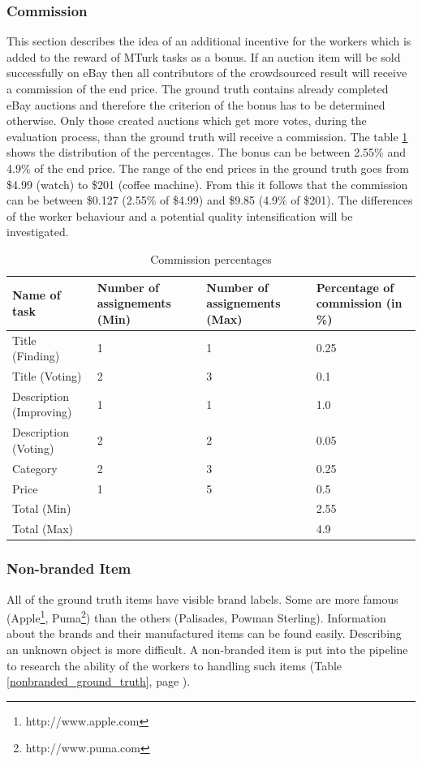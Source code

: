 \subsubsection{Commission}
This section describes the idea of an additional incentive for the workers which is added to the reward of MTurk tasks as a bonus. If an auction item will be sold successfully on eBay then all contributors of the crowdsourced result will receive a commission of the end price. The ground truth contains already completed eBay auctions and therefore the criterion of the bonus has to be determined otherwise. Only those created auctions which get more votes, during the evaluation process, than the ground truth will receive a commission. The table \ref{comm_perc} shows the distribution of the percentages. The bonus can be between 2.55\% and 4.9\% of the end price. The range of the end prices in the ground truth goes from \$4.99 (watch) to \$201 (coffee machine). From this it follows that the commission can be between \$0.127 (2.55\% of \$4.99) and \$9.85 (4.9\% of \$201). The differences of the worker behaviour and a potential quality intensification will be investigated. 
\begin{table}[h!]
	\begin{center}
	\begin{tabular}{| p{3.25cm} | p{3.25cm} | p{3.25cm} | p{3.25cm} |}
		\hline
		\textbf{Name of task} & \textbf{Number of assignements (Min)} & \textbf{Number of assignements (Max)} & \textbf{Percentage of commission (in \%)} \\
		\hline
		Title (Finding) & 1 & 1 & 0.25 \\
		\hline
		Title (Voting) & 2 & 3 & 0.1 \\
		\hline
		Description (Improving) & 1 & 1 & 1.0 \\
		\hline
		Description (Voting) & 2 & 2 & 0.05 \\
		\hline
		Category & 2 & 3 & 0.25 \\
		\hline
		Price & 1 & 5 & 0.5 \\
		\hline
		Total (Min) & & & 2.55 \\
		\hline
		Total (Max) & & & 4.9 \\
		\hline
	\end{tabular}
	\end{center}
	\caption{Commission percentages}
	\label{comm_perc}
\end{table}

\subsubsection{Non-branded Item}
All of the ground truth items have visible brand labels. Some are more famous (Apple\footnote{http://www.apple.com}, Puma\footnote{http://www.puma.com}) than the others (Palisades, Powman Sterling). Information about the brands and their manufactured items can be found easily. Describing an unknown object is more difficult. A non-branded item is put into the pipeline to research the ability of the workers to handling such items (Table \ref{nonbranded_ground_truth}, page \pageref{nonbranded_ground_truth}). 

